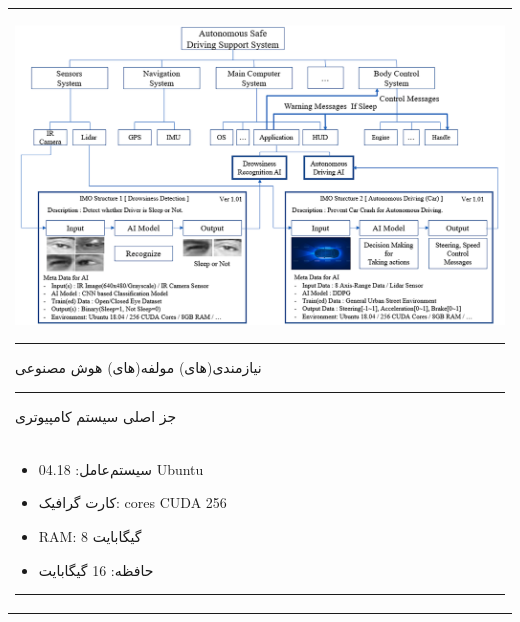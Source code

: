 \documentclass[a4paper,10pt]{article}
\begin{document}
\begin{table}[htbp]
\begin{tabularx}{\textwidth}{ X }
                    \includegraphics[width=1\linewidth]{image/fig table 5.png} 

                    \vspace{3pt}

                    \hrule

                    \vspace{3pt}

                    نیازمندی(های) مولفه(های) هوش مصنوعی

                    \vspace{3pt}

                    \hrule

                    \vspace{3pt}

                    جز اصلی سیستم کامپیوتری \\

                    \vspace{-10pt}

                    \begin{itemize}
                        
                        \item سیستم‌عامل: 04.18 Ubuntu
                        
                        \item کارت گرافیک: cores CUDA 256
                        
                        \item RAM: 8 گیگابایت
                        
                        \item حافظه: 16 گیگابایت

                    \end{itemize}

                    \hrule

                \end{tabularx}

            \end{table}
\end{document}
